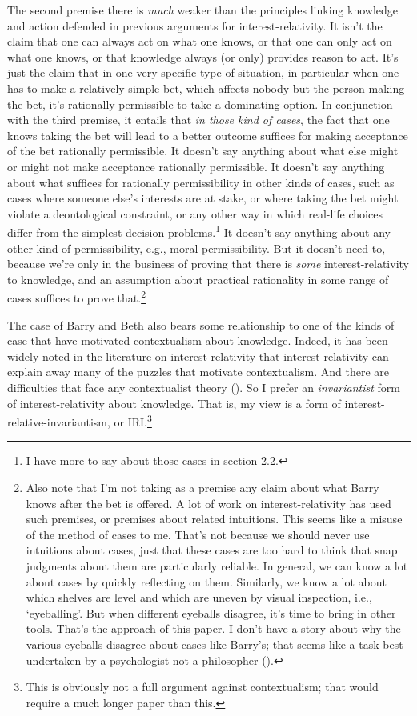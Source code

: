 \documentclass[
  11pt,
  letterpaper,
  DIV=11,
  numbers=noendperiod,
  twoside]{scrartcl}
\begin{document}
The second premise there is \emph{much} weaker than the principles
linking knowledge and action defended in previous arguments for
interest-relativity. It isn't the claim that one can always act on what
one knows, or that one can only act on what one knows, or that knowledge
always (or only) provides reason to act. It's just the claim that in one
very specific type of situation, in particular when one has to make a
relatively simple bet, which affects nobody but the person making the
bet, it's rationally permissible to take a dominating option. In
conjunction with the third premise, it entails that \emph{in those kind
of cases}, the fact that one knows taking the bet will lead to a better
outcome suffices for making acceptance of the bet rationally
permissible. It doesn't say anything about what else might or might not
make acceptance rationally permissible. It doesn't say anything about
what suffices for rationally permissibility in other kinds of cases,
such as cases where someone else's interests are at stake, or where
taking the bet might violate a deontological constraint, or any other
way in which real-life choices differ from the simplest decision
problems.\footnote{I have more to say about those cases in section 2.2.}
It doesn't say anything about any other kind of permissibility, e.g.,
moral permissibility. But it doesn't need to, because we're only in the
business of proving that there is \emph{some} interest-relativity to
knowledge, and an assumption about practical rationality in some range
of cases suffices to prove that.\footnote{Also note that I'm not taking
  as a premise any claim about what Barry knows after the bet is
  offered. A lot of work on interest-relativity has used such premises,
  or premises about related intuitions. This seems like a misuse of the
  method of cases to me. That's not because we should never use
  intuitions about cases, just that these cases are too hard to think
  that snap judgments about them are particularly reliable. In general,
  we can know a lot about cases by quickly reflecting on them.
  Similarly, we know a lot about which shelves are level and which are
  uneven by visual inspection, i.e., `eyeballing'. But when different
  eyeballs disagree, it's time to bring in other tools. That's the
  approach of this paper. I don't have a story about why the various
  eyeballs disagree about cases like Barry's; that seems like a task
  best undertaken by a psychologist not a philosopher
  ().}

The case of Barry and Beth also bears some relationship to one of the
kinds of case that have motivated contextualism about knowledge. Indeed,
it has been widely noted in the literature on interest-relativity that
interest-relativity can explain away many of the puzzles that motivate
contextualism. And there are difficulties that face any contextualist
theory (). So I
prefer an \emph{invariantist} form of interest-relativity about
knowledge. That is, my view is a form of interest-relative-invariantism,
or IRI.\footnote{This is obviously not a full argument against
  contextualism; that would require a much longer paper than this.}
\end{document}
